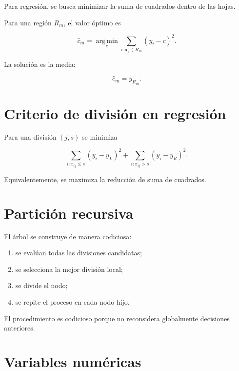 \documentclass[
  spanish,
  10.5pt,
  letterpaper,
  DIV=11,
  numbers=noendperiod,
  oneside,
  open=any]{scrreprt}
\providecommand{\tightlist}{%
  \setlength{\itemsep}{0pt}\setlength{\parskip}{0pt}}
\theoremstyle{definition}
\theoremstyle{definition}
\theoremstyle{plain}
\theoremstyle{remark}
\begin{document}

Para regresión, se busca minimizar la suma de cuadrados dentro de las
hojas.

Para una región \(R_m\), el valor óptimo es

\[
\widehat{c}_m
=
\operatorname*{arg\,min}_{c}
\sum_{i:\mathbf{x}_i\in R_m}
(y_i-c)^2.
\]

La solución es la media:

\[
\widehat{c}_m
=
\overline{y}_{R_m}.
\]

\section*{Criterio de división en
regresión}\label{criterio-de-divisiuxf3n-en-regresiuxf3n}


Para una división \((j,s)\) se minimiza

\[
\sum_{i:x_{ij}\leq s}
\left(
y_i-\overline{y}_L
\right)^2
+
\sum_{i:x_{ij}>s}
\left(
y_i-\overline{y}_R
\right)^2.
\]

Equivalentemente, se maximiza la reducción de suma de cuadrados.

\section*{Partición recursiva}\label{particiuxf3n-recursiva}


El árbol se construye de manera codiciosa:

\begin{enumerate}
\def\labelenumi{\arabic{enumi}.}
\tightlist
\item
  se evalúan todas las divisiones candidatas;
\item
  se selecciona la mejor división local;
\item
  se divide el nodo;
\item
  se repite el proceso en cada nodo hijo.
\end{enumerate}

El procedimiento es codicioso porque no reconsidera globalmente
decisiones anteriores.

\section*{Variables numéricas}\label{variables-numuxe9ricas}
\end{document}
